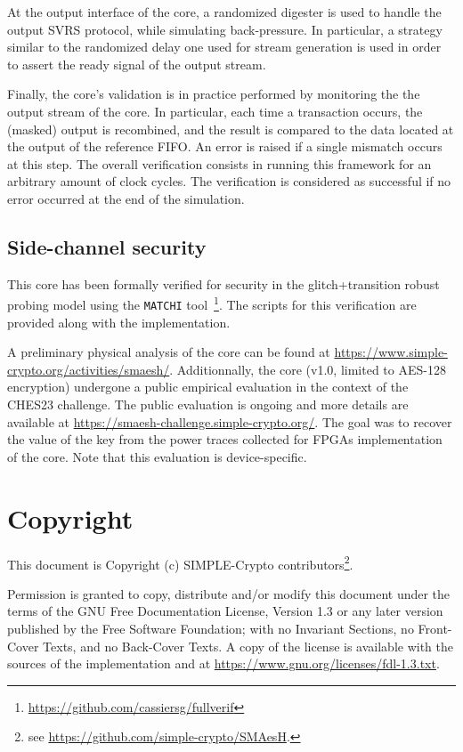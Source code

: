 \documentclass{scrartcl}
\begin{document}
At the output interface of the core, a randomized digester is used to handle the
output SVRS protocol, while simulating back-pressure. In particular, a strategy
similar to the randomized delay one used for stream generation is used in order
to assert the ready signal of the output stream. 

Finally, the core's validation is in practice performed by monitoring the
the output stream of the core. In particular, each time a transaction occurs,
the (masked) output is recombined, and the result is compared to the data
located at the output of the reference FIFO. An error is raised if a single
mismatch occurs at this step. The overall verification consists in running this
framework for an arbitrary amount of clock cycles.  The verification is
considered as successful if no error occurred at the end of the simulation. 

\subsection{Side-channel security}
This core has been formally verified for security in the glitch+transition
robust probing model using the \texttt{MATCHI}%
tool~\cite{DBLP:journals/tc/CassiersGLS21,DBLP:journals/tches/CassiersS21}\footnote{\url{https://github.com/cassiersg/fullverif}}.
The scripts for this verification are provided along with the implementation.

A preliminary physical analysis of the core can be found at
\url{https://www.simple-crypto.org/activities/smaesh/}.  Additionnally, the
core (v1.0, limited to AES-128 encryption) undergone a public empirical
evaluation in the context of the CHES23 challenge. The public evaluation is
ongoing and more details are available at
\url{https://smaesh-challenge.simple-crypto.org/}.  The goal was to recover the
value of the key from the power traces collected for FPGAs implementation of
the core. Note that this evaluation is device-specific.

\section{Copyright}

This document is Copyright (c) SIMPLE-Crypto contributors\footnote{see \url{https://github.com/simple-crypto/SMAesH}.}.

Permission is granted to copy, distribute and/or modify this document under the
terms of the GNU Free Documentation License, Version 1.3 or any later version
published by the Free Software Foundation; with no Invariant Sections, no
Front-Cover Texts, and no Back-Cover Texts.
A copy of the license is available with the sources of the implementation and
at \url{https://www.gnu.org/licenses/fdl-1.3.txt}.



\end{document}
